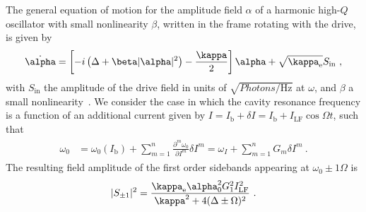 The general equation of motion for the amplitude field $\alpha$ of a harmonic high-$Q$ oscillator with small nonlinearity $\beta$, written in the frame rotating with the drive, is given by
% 
\begin{align}
\dot{\alpha} = \left[ -i \left( \Delta+\beta\abs{\alpha}^2 \right)-\frac{\kappa}{2} \right]\alpha + \sqrt{\kappa_\text{e}} S_\text{in}\ ,
\label{eq:Duffing-EOM}
\end{align}
% 
with $S_\text{in}$ the amplitude of the drive field in units of $\sqrt{\si{Photons\per\hertz}}$ at $\omega$, and $\beta$ a small nonlinearity~\cite{eichlerControllingDynamicRange2014d}.
% 
We consider the case in which the cavity resonance frequency is a function of an additional current given by $I = I_\text{b} + \delta I=I_\text{b}+I_\text{LF}\cos\Omega t$, such that
% 
\begin{align}
\begin{split}
\omega_0 &= \omega_0(I_\text{b}) + \sum_{m=1}^n \frac{\partial^m \omega_0}{\partial I^m}\delta I^m = \omega_I + \sum_{m=1}^n G_m \delta I^m \ .
\label{eq:omega_Taylor}
\end{split}
\end{align}
% 
The resulting field amplitude of the first order sidebands appearing at $\omega_0\pm1\Omega$ is
% 
\begin{align}
\abs{S_{\pm 1}}^2 = \frac{\kappa_\text{e}\alpha_0^2 G_1^2 I_\text{LF}^2}{\kappa^2+4(\Delta\pm\Omega)^2}\ .
\label{eq:first_amplitude}
\end{align}


